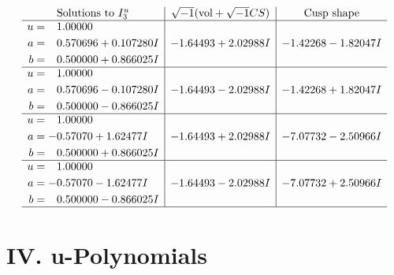 \documentclass[1p]{elsarticle_modified}
\theoremstyle{definition}
\newcommand{\I}{\sqrt{-1}}
\begin{document}
$$\begin{array}{c|c|c}  
\text{Solutions to }I^u_{3}& \I (\text{vol} + \sqrt{-1}CS) & \text{Cusp shape}\\
 \hline 
\begin{aligned}
u &= \phantom{-}1.00000\phantom{ +0.000000I} \\
a &= \phantom{-}0.570696 + 0.107280 I \\
b &= \phantom{-}0.500000 + 0.866025 I\end{aligned}
 & -1.64493 + 2.02988 I & -1.42268 - 1.82047 I \\ \hline\begin{aligned}
u &= \phantom{-}1.00000\phantom{ +0.000000I} \\
a &= \phantom{-}0.570696 - 0.107280 I \\
b &= \phantom{-}0.500000 - 0.866025 I\end{aligned}
 & -1.64493 - 2.02988 I & -1.42268 + 1.82047 I \\ \hline\begin{aligned}
u &= \phantom{-}1.00000\phantom{ +0.000000I} \\
a &= -0.57070 + 1.62477 I \\
b &= \phantom{-}0.500000 + 0.866025 I\end{aligned}
 & -1.64493 + 2.02988 I & -7.07732 - 2.50966 I \\ \hline\begin{aligned}
u &= \phantom{-}1.00000\phantom{ +0.000000I} \\
a &= -0.57070 - 1.62477 I \\
b &= \phantom{-}0.500000 - 0.866025 I\end{aligned}
 & -1.64493 - 2.02988 I & -7.07732 + 2.50966 I\\
 \hline 
 \end{array}$$\newpage
\newpage\renewcommand{\arraystretch}{1}
\centering \section*{ IV. u-Polynomials}
\end{document}
